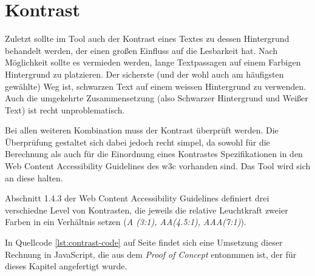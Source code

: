 \section{Kontrast}
Zuletzt sollte im Tool auch der Kontrast eines Textes zu dessen Hintergrund behandelt werden, der einen großen Einfluss auf die Lesbarkeit hat.
Nach Möglichkeit sollte es vermieden werden, lange Textpassagen auf einem Farbigen Hintergrund zu platzieren.
Der sicherste (und der wohl auch am häufigsten gewählte) Weg ist, schwarzen Text auf einem weissen Hintergrund zu verwenden. Auch die umgekehrte Zusammensetzung (also Schwarzer Hintergrund und Weißer Text) ist recht unproblematisch.

Bei allen weiteren Kombination muss der Kontrast überprüft werden. Die Überprüfung gestaltet sich dabei jedoch recht simpel, da sowohl für die Berechnung als auch für die Einordnung eines Kontrastes Spezifikationen in den Web Content Accessibility Guidelines des w3c \cite{W3C} vorhanden sind. Das Tool wird sich an diese halten.

Abschnitt 1.4.3 der Web Content Accessibility Guidelines definiert drei verschiedne Level von Kontrasten, die jeweils die relative Leuchtkraft zweier Farben in ein Verhältnis setzen (\textit{A (3:1), AA(4.5:1), AAA(7:1)}).

In Quellcode \ref{lst:contrast-code} auf Seite \pageref{lst:contrast-code} findet sich eine Umsetzung dieser Rechnung in JavaScript, die aus dem \textit{Proof of Concept} entonmmen ist, der für dieses Kapitel angefertigt wurde.

